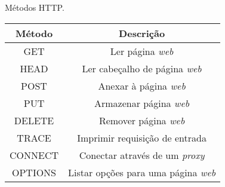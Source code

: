 \begin{quadro}[!htb]
	\centering
	\caption{Métodos HTTP.\label{qua:metodoshttp}}
	\begin{tabular}{| c | c |}
		\hline
		\textbf{Método} & \textbf{Descrição}							 \\
		\hline
		GET             & Ler página \textit{web}					             \\
		\hline
		HEAD            & Ler cabeçalho de página \textit{web}					 \\
		\hline
		POST            & Anexar à página \textit{web}					         \\
		\hline
		PUT             & Armazenar página \textit{web}                            \\
		\hline
		DELETE          & Remover página \textit{web }                             \\
		\hline
		TRACE           & Imprimir requisição de entrada                  \\
		\hline
		CONNECT         & Conectar através de um \textit{proxy}                    \\
		\hline
		OPTIONS         & Listar opções para uma página \textit{web}               \\
		\hline
	\end{tabular}
\end{quadro}